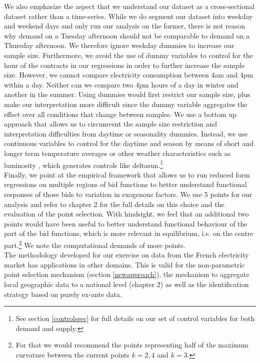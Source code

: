 We also emphasize the aspect that we understand our dataset as a cross-sectional dataset rather than a time-series. 
\label{nodummies}
While we do segment our dataset into weekday and weekend days and only run our analysis on the former, there is not reason why demand on a Tuesday afternoon should not be comparable to demand on a Thursday afternoon. We therefore ignore weekday dummies to increase our sample size. 
Furthermore, we avoid the use of dummy variables to control for the hour of the contracts in our regressions in order to further increase the sample size. However, we cannot compare electricity consumption between 4am and 4pm within a day. Neither can we compare two 4pm hours of a day in winter and another in the summer. Using dummies would first restrict our sample size, plus make our interpretation more difficult since the dummy variable aggregates the effect over all conditions that change between samples. We use a bottom up approach that allows us to circumvent the sample size restriction and interpretation difficulties from daytime or seasonality dummies. Instead, we use continuous variables to control for the daytime and season by means of short and longer term temperature averages or other weather characteristics such as luminosity , which generates controls like deltasun.\footnote{See section \ref{controlssec} for full details on our set of control variables for both demand and supply.} \\

Finally, we point at the empirical framework that allows us to run reduced form regressions on multiple regions of bid functions to better understand functional responses of those bids to variation in exogenous factors. We use 5 points for our analysis and refer to chapter 2 for the full details on this choice and the evaluation of the point selection. With hindsight, we feel that an additional two points would have been useful to better understand functional behaviour of the part of the bid functions, which is more relevant in equilibrium, i.e. on the centre part.\footnote{For that we would recommend the points representing half of the maximum curvature between the current points $k=2,4$ and $k=3$.}
We note the computational demands of more points. \\

\label{externalvalidity}
The methodology developed for our exercise on data from the French electricity market has applications in other domains. This is valid for the non-parametric point selection mechanism (section \ref{newapproach}), the mechanism to aggregate local geographic data to a national level (chapter 2) as well as the identification strategy based on purely ex-ante data. \\

